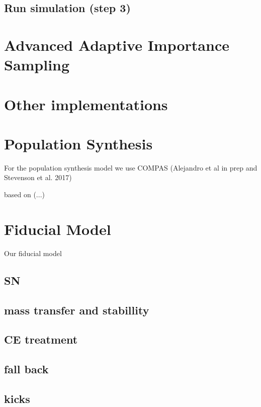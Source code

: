 \subsection{Run simulation (step 3) }

\section{Advanced Adaptive Importance Sampling}

\section{Other implementations}


\section{Population Synthesis}
For the population synthesis model we use COMPAS (Alejandro et al in prep and Stevenson et al. 2017) 

based on (...) 

\section{Fiducial Model}

Our fiducial model 

\subsection{SN}
\subsection{mass transfer and stabillity}
\subsection{CE treatment}
\subsection{fall back}
\subsection{kicks}




